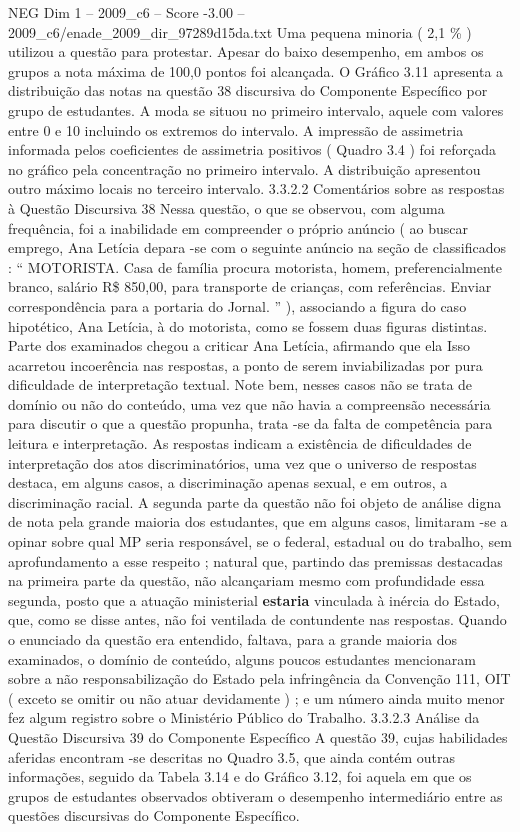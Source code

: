 \begin{textsample}{NEG Dim 1 – 2009\_c6 – Score -3.00 – 2009\_c6/enade\_2009\_dir\_97289d15da.txt}
Uma pequena minoria ( 2,1 \% ) utilizou a questão para protestar.
Apesar do baixo desempenho, em ambos os grupos a nota máxima de 100,0 pontos foi alcançada.
O Gráfico 3.11 apresenta a distribuição das notas na questão 38 discursiva do Componente Específico por grupo de estudantes.
A moda se situou no primeiro intervalo, aquele com valores entre 0 e 10 incluindo os extremos do intervalo.
A impressão de assimetria informada pelos coeficientes de assimetria positivos ( Quadro 3.4 ) foi reforçada no gráfico pela concentração no primeiro intervalo.
A distribuição apresentou outro máximo locais no terceiro intervalo. 3.3.2.2 Comentários sobre as respostas à Questão Discursiva 38 Nessa questão, o que se observou, com alguma frequência, foi a inabilidade em compreender o próprio anúncio ( ao buscar emprego, Ana Letícia depara -se com o seguinte anúncio na seção de classificados : “ MOTORISTA.
Casa de família procura motorista, homem, preferencialmente branco, salário R\$ 850,00, para transporte de crianças, com referências.
Enviar correspondência para a portaria do Jornal. ” ), associando a figura do caso hipotético, Ana Letícia, à do motorista, como se fossem duas figuras distintas.
Parte dos examinados chegou a criticar Ana Letícia, afirmando que ela Isso acarretou incoerência nas respostas, a ponto de serem inviabilizadas por pura dificuldade de interpretação textual.
Note bem, nesses casos não se trata de domínio ou não do conteúdo, uma vez que não havia a compreensão necessária para discutir o que a questão propunha, trata -se da falta de competência para leitura e interpretação.
As respostas indicam a existência de dificuldades de interpretação dos atos discriminatórios, uma vez que o universo de respostas destaca, em alguns casos, a discriminação apenas sexual, e em outros, a discriminação racial.
A segunda parte da questão não foi objeto de análise digna de nota pela grande maioria dos estudantes, que em alguns casos, limitaram -se a opinar sobre qual MP seria responsável, se o federal, estadual ou do trabalho, sem aprofundamento a esse respeito ; natural que, partindo das premissas destacadas na primeira parte da questão, não alcançariam mesmo com profundidade essa segunda, posto que a atuação ministerial \textbf{estaria} vinculada à inércia do Estado, que, como se disse antes, não foi ventilada de contundente nas respostas.
Quando o enunciado da questão era entendido, faltava, para a grande maioria dos examinados, o domínio de conteúdo, alguns poucos estudantes mencionaram sobre a não responsabilização do Estado pela infringência da Convenção 111, OIT ( exceto se omitir ou não atuar devidamente ) ; e um número ainda muito menor fez algum registro sobre o Ministério Público do Trabalho. 3.3.2.3 Análise da Questão Discursiva 39 do Componente Específico A questão 39, cujas habilidades aferidas encontram -se descritas no Quadro 3.5, que ainda contém outras informações, seguido da Tabela 3.14 e do Gráfico 3.12, foi aquela em que os grupos de estudantes observados obtiveram o desempenho intermediário entre as questões discursivas do Componente Específico.

\end{textsample}
